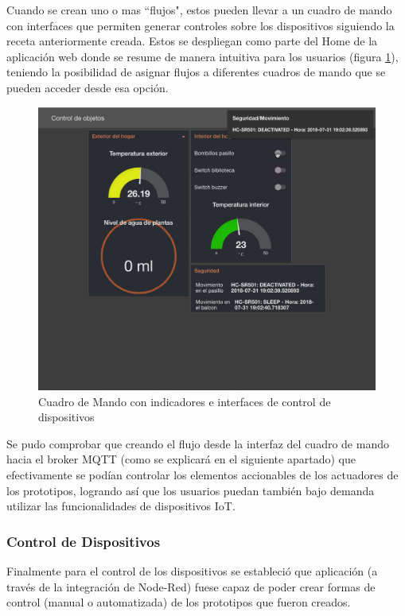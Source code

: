 Cuando se crean uno o mas ``flujos", estos pueden llevar a un cuadro de mando con interfaces que permiten generar controles sobre los dispositivos siguiendo la receta anteriormente creada. Estos se despliegan como parte del Home de la aplicación web donde se resume de manera intuitiva para los usuarios (figura \ref{fig:node_red_ui}), teniendo la posibilidad de asignar flujos a diferentes cuadros de mando que se pueden acceder desde esa opción.\\

\begin{figure}[htb]
\centering
\includegraphics[scale=0.315]{./Figuras/node_red_ui.png}
\caption{Cuadro de Mando con indicadores e interfaces de control de dispositivos}
\label{fig:node_red_ui}
\vspace*{-10pt}
\end{figure}

Se pudo comprobar que creando el flujo desde la interfaz del cuadro de mando hacia el broker MQTT (como se explicará en el siguiente apartado) que efectivamente se podían controlar los elementos accionables de los actuadores de los prototipos, logrando así que los usuarios puedan también bajo demanda utilizar las funcionalidades de dispositivos IoT.

\subsubsection{Control de Dispositivos}
Finalmente para el control de los dispositivos se estableció que aplicación (a través de la integración de Node-Red) fuese capaz de poder crear formas de control (manual o automatizada) de los prototipos que fueron creados.\\

